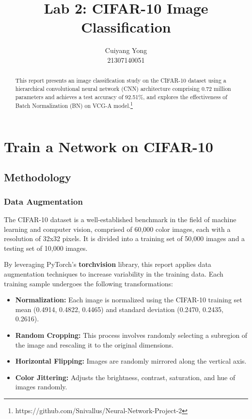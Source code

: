 \documentclass{article}
\title{Lab 2: CIFAR-10 Image Classification}
\author{
Cuiyang Yong\\
21307140051
}
\begin{document}
\maketitle

\begin{abstract}
This report presents an image classification study on the CIFAR-10 dataset using a hierarchical convolutional neural network (CNN) architecture comprising 0.72 million parameters and achieves a test accuracy of 92.51\%, and explores the effectiveness of Batch Normalization (BN) on VCG-A model.\footnote{https://github.com/Snivallus/Neural-Network-Project-2}
\end{abstract}

\section{Train a Network on CIFAR-10}

\subsection{Methodology}

\subsubsection{Data Augmentation}
The CIFAR-10 dataset is a well-established benchmark in the field of machine learning and computer vision, comprised of 60,000 color images, each with a resolution of 32x32 pixels. It is divided into a training set of 50,000 images and a testing set of 10,000 images.

By leveraging PyTorch’s \textbf{torchvision} library, this report applies data augmentation techniques to increase variability in the training data. Each training sample undergoes the following transformations:

\begin{itemize}

    \item \textbf{Normalization:} Each image is normalized using the CIFAR-10 training set mean (0.4914, 0.4822, 0.4465) and standard deviation (0.2470, 0.2435, 0.2616).

    \item \textbf{Random Cropping:} This process involves randomly selecting a subregion of the image and rescaling it to the original dimensions.

    \item \textbf{Horizontal Flipping:} Images are randomly mirrored along the vertical axis.

    \item \textbf{Color Jittering:} Adjusts the brightness, contrast, saturation, and hue of images randomly.
    
\end{itemize}
\end{document}
